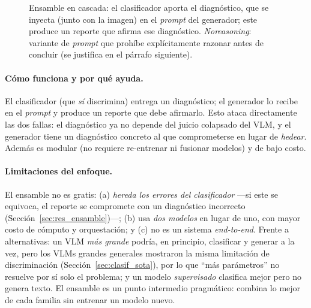 \documentclass[11pt, a4paper]{article}
\begin{document}
\begin{figure}[H]
\centering
{}
\caption{Ensamble en cascada: el clasificador aporta el diagnóstico, que se inyecta (junto con la
imagen) en el \emph{prompt} del generador; este produce un reporte que afirma ese diagnóstico.
\emph{Noreasoning}: variante de \emph{prompt} que prohíbe explícitamente razonar antes de concluir
(se justifica en el párrafo siguiente).}
\label{fig:cascada}
\end{figure}

\paragraph{Cómo funciona y por qué ayuda.} El clasificador (que \emph{sí} discrimina) entrega un
diagnóstico; el generador lo recibe en el \emph{prompt} y produce un reporte que debe afirmarlo. Esto
ataca directamente las dos fallas: el diagnóstico ya no depende del juicio colapsado del VLM, y el
generador tiene un diagnóstico concreto al que comprometerse en lugar de \emph{hedear}. Además es modular (no
requiere re-entrenar ni fusionar modelos) y de bajo costo.

\paragraph{Limitaciones del enfoque.} El ensamble no es gratis: (a) \emph{hereda los errores del
clasificador} —si este se equivoca, el reporte se compromete con un diagnóstico incorrecto
(Sección~\ref{sec:res_ensamble})—; (b) usa \emph{dos modelos} en lugar de uno, con mayor costo de
cómputo y orquestación; y (c) no es un sistema \emph{end-to-end}. Frente a alternativas: un VLM
\emph{más grande} podría, en principio, clasificar y generar a la vez, pero los VLMs grandes generales
mostraron la misma limitación de discriminación (Sección~\ref{sec:clasif_sota}), por lo que ``más
parámetros'' no resuelve por sí solo el problema; y un modelo \emph{supervisado} clasifica mejor pero no
genera texto. El ensamble es un punto intermedio pragmático: combina lo mejor de cada familia sin
entrenar un modelo nuevo.
\end{document}
